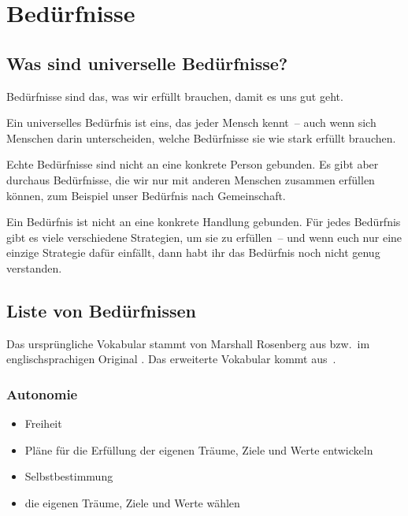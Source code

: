 \section{Bedürfnisse}
\label{beduerfnisse}

\subsection{Was sind universelle Bedürfnisse?}

Bedürfnisse sind das, was wir erfüllt brauchen, damit es uns gut geht.

Ein universelles Bedürfnis ist eins, das jeder Mensch kennt~-- auch wenn sich Menschen darin unterscheiden, welche Bedürfnisse sie wie stark erfüllt brauchen.

Echte Bedürfnisse sind nicht an eine konkrete Person gebunden. Es gibt aber durchaus Bedürfnisse, die wir nur mit anderen Menschen zusammen erfüllen können, zum Beispiel unser Bedürfnis nach Gemeinschaft.

Ein Bedürfnis ist nicht an eine konkrete Handlung gebunden. Für jedes Bedürfnis gibt es viele verschiedene Strategien, um sie zu erfüllen~-- und wenn euch nur eine einzige Strategie dafür einfällt, dann habt ihr das Bedürfnis noch nicht genug verstanden.

\subsection{Liste von Bedürfnissen}
\label{beduerfnisse-liste}

Das ursprüngliche Vokabular stammt von Marshall Rosenberg aus \cite[S.~216~f]{gfk-rosenberg} bzw.~im englischsprachigen Original \cite[S.~210]{nvc-rosenberg}. Das erweiterte Vokabular kommt aus~\cite[S.~75~f]{gfk-dummies}.


\subsubsection{Autonomie}

\begin{multicols}{2}
  \begin{itemize}
    \item Freiheit
    \item Pläne für die Erfüllung der eigenen Träume, Ziele und Werte entwickeln
    \item Selbstbestimmung
    \item die eigenen Träume, Ziele und Werte wählen
  \end{itemize}
\end{multicols}


